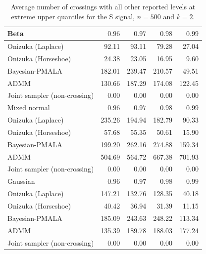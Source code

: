 \begin{table}[!htbp]
\centering
\small
\caption{Average number of crossings with all other reported levels at extreme upper quantiles for the S signal, $n=500$ and $k=2$.}
\label{tab:s_ext_upper_cross_all}
\begin{tabular}{lrrrr}
\toprule
Beta & $0.96$ & $0.97$ & $0.98$ & $0.99$ \\
\midrule
Onizuka (Laplace) & 92.11 & 93.11 & 79.28 & 27.04 \\
Onizuka (Horseshoe) & 24.38 & 23.05 & 16.95 & 9.60 \\
Bayesian-PMALA & 182.01 & 239.47 & 210.57 & 49.51 \\
ADMM & 130.66 & 187.29 & 174.08 & 122.45 \\
Joint sampler (non-crossing) & 0.00 & 0.00 & 0.00 & 0.00 \\
\midrule
Mixed normal & $0.96$ & $0.97$ & $0.98$ & $0.99$ \\
\midrule
Onizuka (Laplace) & 235.26 & 194.94 & 182.79 & 90.33 \\
Onizuka (Horseshoe) & 57.68 & 55.35 & 50.61 & 15.90 \\
Bayesian-PMALA & 199.20 & 262.16 & 274.88 & 159.34 \\
ADMM & 504.69 & 564.72 & 667.38 & 701.93 \\
Joint sampler (non-crossing) & 0.00 & 0.00 & 0.00 & 0.00 \\
\midrule
Gaussian & $0.96$ & $0.97$ & $0.98$ & $0.99$ \\
\midrule
Onizuka (Laplace) & 147.21 & 132.76 & 128.35 & 40.18 \\
Onizuka (Horseshoe) & 40.42 & 36.94 & 31.39 & 11.15 \\
Bayesian-PMALA & 185.09 & 243.63 & 248.22 & 113.34 \\
ADMM & 135.39 & 189.78 & 188.03 & 177.24 \\
Joint sampler (non-crossing) & 0.00 & 0.00 & 0.00 & 0.00 \\
\bottomrule
\end{tabular}
\end{table}
